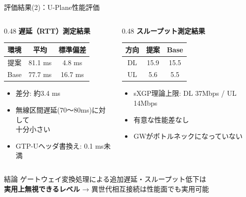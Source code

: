 \documentclass[dvipdfmx,11pt,aspectratio=169]{beamer}
\begin{document}
\begin{frame}{評価結果(2)：U-Plane性能評価}
  \begin{columns}[T]
    \begin{column}{0.48\textwidth}
      \textbf{遅延（RTT）測定結果}
      \begin{table}
        \tiny
        \begin{tabular}{|c|c|c|}
          \hline
          \textbf{環境} & \textbf{平均} & \textbf{標準偏差} \\
          \hline
          提案 & 81.1 ms & 4.8 ms \\
          \hline
          Base & 77.7 ms & 16.7 ms \\
          \hline
        \end{tabular}
      \end{table}
      \begin{itemize}
        \scriptsize
        \item 差分: 約3.4 ms
        \item 無線区間遅延(70〜80ms)に対して\\十分小さい
        \item GTP-Uヘッダ書換え: 0.1 ms未満
      \end{itemize}
    \end{column}
    \begin{column}{0.48\textwidth}
      \textbf{スループット測定結果}
      \begin{table}
        \tiny
        \begin{tabular}{|c|c|c|}
          \hline
          \textbf{方向} & \textbf{提案} & \textbf{Base} \\
          \hline
          DL & 15.9 & 15.5 \\
          \hline
          UL & 5.6 & 5.5 \\
          \hline
        \end{tabular}
      \end{table}
      \begin{itemize}
        \scriptsize
        \item sXGP理論上限: DL 37Mbps / UL 14Mbps
        \item 有意な性能差なし
        \item GWがボトルネックになっていない
      \end{itemize}
    \end{column}
  \end{columns}

  \vspace{0.3cm}
  \begin{alertblock}{結論}
    \centering
    ゲートウェイ変換処理による追加遅延・スループット低下は\\
    \textbf{実用上無視できるレベル} → 異世代相互接続は性能面でも実用可能
  \end{alertblock}
\end{frame}
\end{document}
